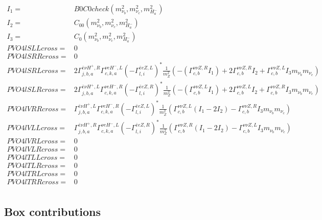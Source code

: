 \documentclass[A4,landscape]{article}
\begin{document}
\begin{align} 
I_1= & B0C0check(m^2_{\nu_{{b}}}, m^2_{\nu_{{c}}}, m^2_{H^-_{{a}}}) \\ 
I_2= & C_{00}(m^2_{\nu_{{b}}}, m^2_{\nu_{{c}}}, m^2_{H^-_{{a}}}) \\ 
I_3= & C_0(m^2_{\nu_{{b}}}, m^2_{\nu_{{c}}}, m^2_{H^-_{{a}}}) \\ 
  PVO4lSLLcross= & 0 \\ 
  PVO4lSRRcross= & 0 \\ 
  PVO4lSRLcross= & 2  \Gamma^{\bar{e}\nu H^+,R}_{j, b, a} \Gamma^{\nu e H^- ,L}_{c, k, a} (- \Gamma^{\bar{e}e Z ,L} _{l, i})^* \frac{1}{m^2_{Z}} (-(\Gamma^{\nu \nu Z ,R}_{c, b} I_1) + 2 \Gamma^{\nu \nu Z ,R}_{c, b} I_2 + \Gamma^{\nu \nu Z ,L}_{c, b} I_3 m_{\nu_{{b}}} m_{\nu_{{c}}}) \\ 
  PVO4lSLRcross= & 2  \Gamma^{\bar{e}\nu H^+,L}_{j, b, a} \Gamma^{\nu e H^- ,R}_{c, k, a} (- \Gamma^{\bar{e}e Z ,R} _{l, i})^* \frac{1}{m^2_{Z}} (-(\Gamma^{\nu \nu Z ,L}_{c, b} I_1) + 2 \Gamma^{\nu \nu Z ,L}_{c, b} I_2 + \Gamma^{\nu \nu Z ,R}_{c, b} I_3 m_{\nu_{{b}}} m_{\nu_{{c}}}) \\ 
  PVO4lVRRcross= &  \Gamma^{\bar{e}\nu H^+,L}_{j, b, a} \Gamma^{\nu e H^- ,R}_{c, k, a} (- \Gamma^{\bar{e}e Z ,L} _{l, i})^* \frac{1}{m^2_{Z}} (\Gamma^{\nu \nu Z ,L}_{c, b} (I_1 - 2 I_2) - \Gamma^{\nu \nu Z ,R}_{c, b} I_3 m_{\nu_{{b}}} m_{\nu_{{c}}}) \\ 
  PVO4lVLLcross= &  \Gamma^{\bar{e}\nu H^+,R}_{j, b, a} \Gamma^{\nu e H^- ,L}_{c, k, a} (- \Gamma^{\bar{e}e Z ,R} _{l, i})^* \frac{1}{m^2_{Z}} (\Gamma^{\nu \nu Z ,R}_{c, b} (I_1 - 2 I_2) - \Gamma^{\nu \nu Z ,L}_{c, b} I_3 m_{\nu_{{b}}} m_{\nu_{{c}}}) \\ 
  PVO4lVRLcross= & 0 \\ 
  PVO4lVLRcross= & 0 \\ 
  PVO4lTLLcross= & 0 \\ 
  PVO4lTLRcross= & 0 \\ 
  PVO4lTRLcross= & 0 \\ 
  PVO4lTRRcross= & 0 \\ 
\end{align} 
\subsection{Box contributions} 
\end{document}
